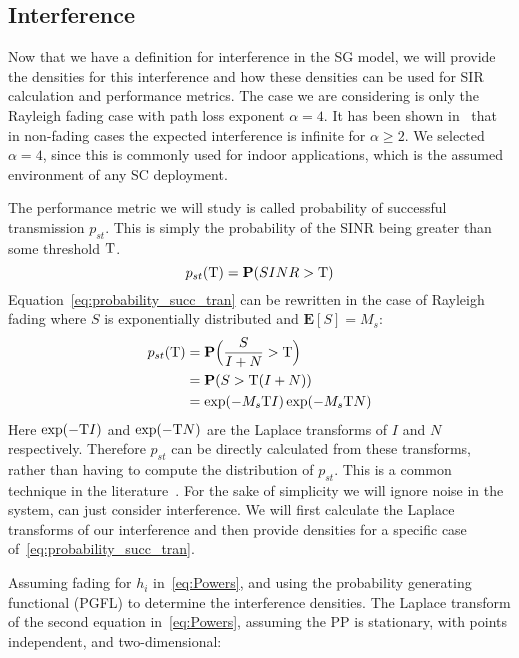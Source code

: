\subsection{Interference}
%
Now that we have a definition for interference in the SG model, we will provide the densities for this interference and how these densities can be used for SIR calculation and performance metrics.  The case we are considering is only the Rayleigh fading case with path loss exponent $\alpha=4$.  It has been shown in~\cite{Haenggi2008} that in non-fading cases the expected interference is infinite for $\alpha \geq 2$.  We selected $\alpha=4$, since this is commonly used for indoor applications, which is the assumed environment of any SC deployment.\par
%
The performance metric we will study is called probability of successful transmission $p_{st}$.  This is simply the probability of the SINR being greater than some threshold $\mathrm{T}$.
%
\begin{equation}\label{eq:probability_succ_tran}
  p_{st}(\mathrm{T}) = \textbf{P}(SINR>\mathrm{T})
\end{equation}
%
Equation~\eqref{eq:probability_succ_tran} can be rewritten in the case of Rayleigh fading where $S$ is exponentially distributed and $\textbf{E}[S] = M_s$:
%
\begin{equation}\label{eq:probability_succ_tran}
  \begin{split}
  p_{st}(\mathrm{T}) &= \textbf{P} \Big(\frac{S}{I+N}>\mathrm{T} \Big) \\
  &= \textbf{P} ( S > \mathrm{T} (I+N) )\\
  &= \exp(-M_s \mathrm{T} I)\exp(- M_s \mathrm{T} N)
  \end{split}
\end{equation}
%
Here $\exp(-\mathrm{T} I)$ and $\exp(-\mathrm{T} N)$ are the Laplace transforms of $I$ and $N$ respectively.  Therefore $p_{st}$ can be directly calculated from these transforms, rather than having to compute the distribution of $p_{st}$.  This is a common technique in the literature~\cite{Haenggi2008,Weber2012}.  For the sake of simplicity we will ignore noise in the system, can just consider interference.  We will first calculate the Laplace transforms of our interference and then provide densities for a specific case of~\eqref{eq:probability_succ_tran}.\par
%
Assuming fading for $h_i$ in~\eqref{eq:Powers}, and using the probability generating functional (PGFL) to determine the interference densities.  The Laplace transform of the second equation in~\eqref{eq:Powers}, assuming the PP is stationary, with points independent, and two-dimensional:
